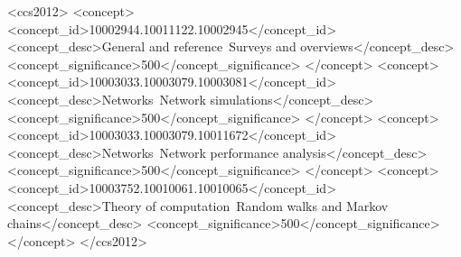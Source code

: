 
\begin{CCSXML}
	<ccs2012>
	<concept>
		<concept_id>10002944.10011122.10002945</concept_id>
		<concept_desc>General and reference~Surveys and overviews</concept_desc>
		<concept_significance>500</concept_significance>
	</concept>
	<concept>
		<concept_id>10003033.10003079.10003081</concept_id>
		<concept_desc>Networks~Network simulations</concept_desc>
		<concept_significance>500</concept_significance>
	</concept>
	<concept>
		<concept_id>10003033.10003079.10011672</concept_id>
		<concept_desc>Networks~Network performance analysis</concept_desc>
		<concept_significance>500</concept_significance>
	</concept>
	<concept>
		<concept_id>10003752.10010061.10010065</concept_id>
		<concept_desc>Theory of computation~Random walks and Markov chains</concept_desc>
		<concept_significance>500</concept_significance>
	</concept>
	</ccs2012>
\end{CCSXML}


